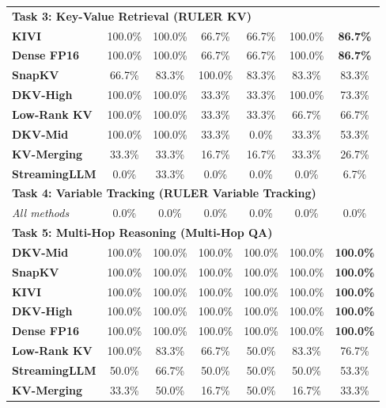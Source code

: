 \documentclass[10pt]{article}
\theoremstyle{definition}
\begin{document}
\begin{table}[h]
\begin{tabular}{lcccccc}
\midrule
\multicolumn{7}{l}{\textbf{Task 3: Key-Value Retrieval (RULER KV)}} \\
\textbf{KIVI} & 100.0\% & 100.0\% & 66.7\% & 66.7\% & 100.0\% & \textbf{86.7\%} \\
\textbf{Dense FP16} & 100.0\% & 100.0\% & 66.7\% & 66.7\% & 100.0\% & \textbf{86.7\%} \\
\textbf{SnapKV} & 66.7\% & 83.3\% & 100.0\% & 83.3\% & 83.3\% & 83.3\% \\
\textbf{DKV-High} & 100.0\% & 100.0\% & 33.3\% & 33.3\% & 100.0\% & 73.3\% \\
\textbf{Low-Rank KV} & 100.0\% & 100.0\% & 33.3\% & 33.3\% & 66.7\% & 66.7\% \\
\textbf{DKV-Mid} & 100.0\% & 100.0\% & 33.3\% & 0.0\% & 33.3\% & 53.3\% \\
\textbf{KV-Merging} & 33.3\% & 33.3\% & 16.7\% & 16.7\% & 33.3\% & 26.7\% \\
\textbf{StreamingLLM} & 0.0\% & 33.3\% & 0.0\% & 0.0\% & 0.0\% & 6.7\% \\
\midrule
\multicolumn{7}{l}{\textbf{Task 4: Variable Tracking (RULER Variable Tracking)}} \\
\textit{All methods} & 0.0\% & 0.0\% & 0.0\% & 0.0\% & 0.0\% & 0.0\% \\
\midrule
\multicolumn{7}{l}{\textbf{Task 5: Multi-Hop Reasoning (Multi-Hop QA)}} \\
\textbf{DKV-Mid} & 100.0\% & 100.0\% & 100.0\% & 100.0\% & 100.0\% & \textbf{100.0\%} \\
\textbf{SnapKV} & 100.0\% & 100.0\% & 100.0\% & 100.0\% & 100.0\% & \textbf{100.0\%} \\
\textbf{KIVI} & 100.0\% & 100.0\% & 100.0\% & 100.0\% & 100.0\% & \textbf{100.0\%} \\
\textbf{DKV-High} & 100.0\% & 100.0\% & 100.0\% & 100.0\% & 100.0\% & \textbf{100.0\%} \\
\textbf{Dense FP16} & 100.0\% & 100.0\% & 100.0\% & 100.0\% & 100.0\% & \textbf{100.0\%} \\
\textbf{Low-Rank KV} & 100.0\% & 83.3\% & 66.7\% & 50.0\% & 83.3\% & 76.7\% \\
\textbf{StreamingLLM} & 50.0\% & 66.7\% & 50.0\% & 50.0\% & 50.0\% & 53.3\% \\
\textbf{KV-Merging} & 33.3\% & 50.0\% & 16.7\% & 50.0\% & 16.7\% & 33.3\% \\
\bottomrule
\end{tabular}
\end{table}

\clearpage
\end{document}

